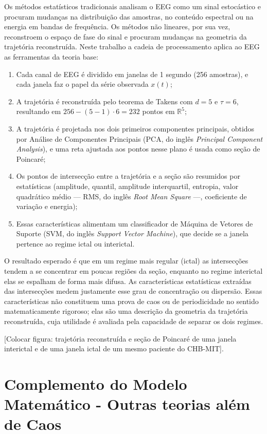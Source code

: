 \documentclass[]{article}
\begin{document}
	Os métodos estatísticos tradicionais analisam o EEG como um sinal estocástico e procuram mudanças na distribuição das amostras, no conteúdo espectral ou na energia em bandas de frequência. Os métodos não lineares, por sua vez, reconstroem o espaço de fase do sinal e procuram mudanças na geometria da trajetória reconstruída. Neste trabalho a cadeia de processamento aplica ao EEG as ferramentas da teoria base:
	\begin{enumerate}
		\item Cada canal de EEG é dividido em janelas de 1 segundo (256 amostras), e cada janela faz o papel da série observada $x(t)$;
		\item A trajetória é reconstruída pelo teorema de Takens com $d = 5$ e $\tau = 6$, resultando em $256 - (5-1)\cdot 6 = 232$ pontos em $\mathbb{R}^5$;
		\item A trajetória é projetada nos dois primeiros componentes principais, obtidos por Análise de Componentes Principais (PCA, do inglês \textit{Principal Component Analysis}), e uma reta ajustada aos pontos nesse plano é usada como seção de Poincaré;
		\item Os pontos de intersecção entre a trajetória e a seção são resumidos por estatísticas (amplitude, quantil, amplitude interquartil, entropia, valor quadrático médio --- RMS, do inglês \textit{Root Mean Square} ---, coeficiente de variação e energia);
		\item Essas características alimentam um classificador de Máquina de Vetores de Suporte (SVM, do inglês \textit{Support Vector Machine}), que decide se a janela pertence ao regime ictal ou interictal.
	\end{enumerate}

	O resultado esperado é que em um regime mais regular (ictal) as intersecções tendem a se concentrar em poucas regiões da seção, enquanto no regime interictal elas se espalham de forma mais difusa. As características estatísticas extraídas das intersecções medem justamente esse grau de concentração ou dispersão. Essas características não constituem uma prova de caos ou de periodicidade no sentido matematicamente rigoroso; elas são uma descrição da geometria da trajetória reconstruída, cuja utilidade é avaliada pela capacidade de separar os dois regimes.

	[Colocar figura: trajetória reconstruída e seção de Poincaré de uma janela interictal e de uma janela ictal de um mesmo paciente do CHB-MIT].

	\section{Complemento do Modelo Matemático - Outras teorias além de Caos}
	\label{sec:other_theories}
	\noindent
\end{document}
